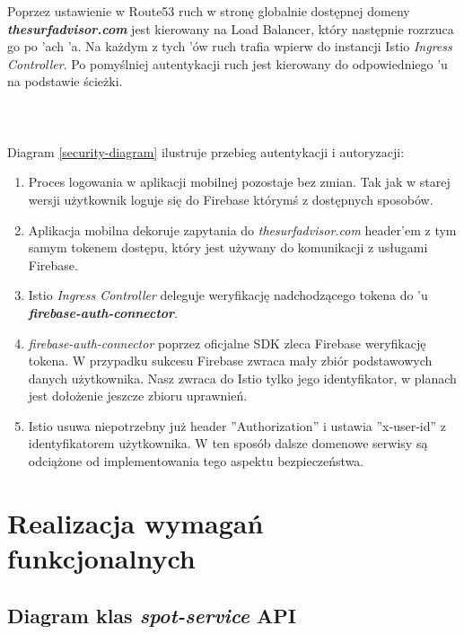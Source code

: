 Poprzez ustawienie w Route53 ruch w stronę globalnie dostępnej domeny \emph{\textbf{thesurfadvisor.com}} jest kierowany na Load Balancer, 
który następnie rozrzuca go po 'ach 'a.
Na każdym z tych 'ów ruch trafia wpierw do instancji Istio \emph{Ingress Controller}. 
Po pomyślniej autentykacji ruch jest kierowany do odpowiedniego 'u na podstawie ścieżki.
\\\\\\\\
Diagram \ref{security-diagram} ilustruje przebieg autentykacji i autoryzacji:
\begin{enumerate}
    \item
    Proces logowania w aplikacji mobilnej pozostaje bez zmian. Tak jak w starej wersji użytkownik loguje się do Firebase którymś z dostępnych sposobów.

    \item
    Aplikacja mobilna dekoruje zapytania do \emph{thesurfadvisor.com} header'em z tym samym tokenem dostępu, który jest używany do komunikacji z usługami Firebase.

    \item
    Istio \emph{Ingress Controller} deleguje weryfikację nadchodzącego tokena do 'u \textbf{\emph{firebase-auth-connector}}.

    \item
    \emph{firebase-auth-connector} poprzez oficjalne SDK zleca Firebase weryfikację tokena.
    W przypadku sukcesu Firebase zwraca mały zbiór podstawowych danych użytkownika.
    Nasz  zwraca do Istio tylko jego identyfikator, w planach jest dołożenie jeszcze zbioru uprawnień. 

    \item
    Istio usuwa niepotrzebny już header ''Authorization'' i ustawia ''x-user-id'' z identyfikatorem użytkownika.
    W ten sposób dalsze domenowe serwisy są odciążone od implementowania tego aspektu bezpieczeństwa.
\end{enumerate} 



\section{Realizacja wymagań funkcjonalnych}

\subsection{Diagram klas \emph{spot-service} API}

